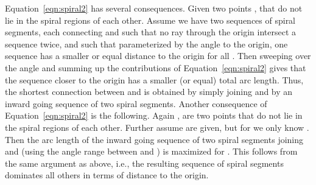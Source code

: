 \documentclass{journalA4}
\begin{document}
Equation~\ref{eqn:spiral2} has several consequences. Given two points ,  that do not lie in the spiral regions of each other. Assume we have two sequences of spiral segments, each connecting  and  such that no ray through the origin intersect a sequence twice, and such that parameterized by the angle  to the origin, one sequence has a smaller or equal distance to the origin for all . Then sweeping over the angle and summing up the contributions of Equation~\ref{eqn:spiral2} gives that the sequence closer to the origin has a smaller (or equal) total arc length. Thus, the shortest connection between  and  is obtained by simply joining  and  by an inward going sequence of two spiral segments. 
Another consequence of Equation~\ref{eqn:spiral2} is the following. Again ,  are two points that do not lie in the spiral regions of each other. Further assume  are given, but for  we only know . Then the arc length of the inward going sequence of two spiral segments joining  and  (using the angle range between  and ) is maximized for . This follows from the same argument as above, i.e., the resulting
sequence of spiral segments dominates all others in terms of distance to the origin.
\end{document}
